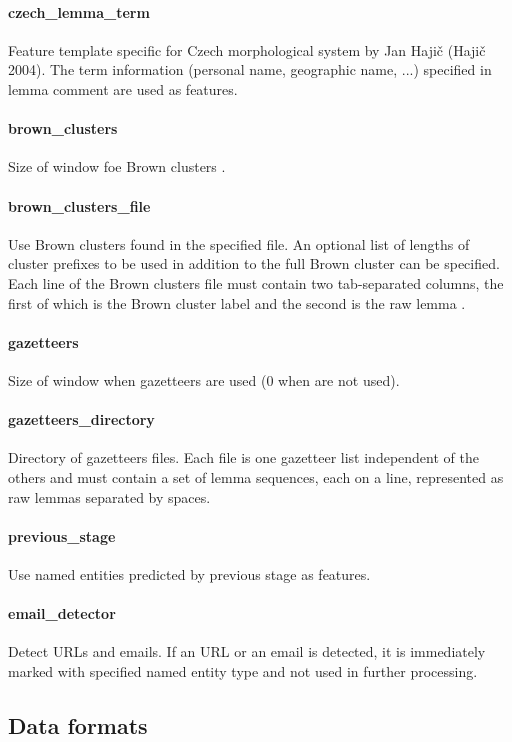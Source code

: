 \paragraph{czech\_lemma\_term}
Feature template specific for Czech morphological system by Jan Hajič (Hajič 2004).
The term information (personal name, geographic name, ...) specified in lemma comment
are used as features.

\paragraph{brown\_clusters}
Size of window foe Brown clusters .

\paragraph{brown\_clusters\_file}
Use Brown clusters found in the specified file. An optional list of lengths of
cluster prefixes to be used in addition to the full Brown cluster can be specified.
Each line of the Brown clusters file must contain two tab-separated columns,
the first of which is the Brown cluster label and the second is the raw lemma .

\paragraph{gazetteers}
Size of window when gazetteers are used (0 when are not used).

\paragraph{gazetteers\_directory}
Directory of gazetteers files. Each file is one gazetteer list independent
of the others and must contain a set of lemma sequences, each on a line,
represented as raw lemmas separated by spaces.

\paragraph{previous\_stage}
Use named entities predicted by previous stage as features.

\paragraph{email\_detector}
Detect URLs and emails. If an URL or an email is detected, it is immediately marked
with specified named entity type and not used in further processing.

\subsection{Data formats}

